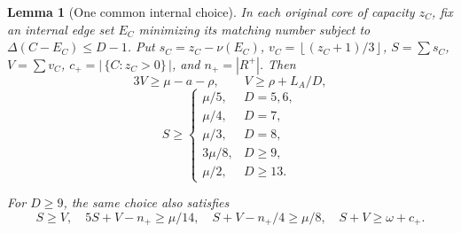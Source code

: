 \documentclass[11pt,a4paper]{article}
\newcommand{\floor}[1]{\left\lfloor#1\right\rfloor}
\newtheorem{lemma}[theorem]{Lemma}
\theoremstyle{definition}
\begin{document}
\begin{lemma}[One common internal choice]\label{lem:internal-saving}
In each original core of capacity $z_C$, fix an internal edge set $E_C$ minimizing its matching number subject to
$\Delta(C-E_C)\le D-1$. Put
$s_C=z_C-\nu(E_C)$, $v_C=\floor{(z_C+1)/3}$,
$S=\sum s_C$, $V=\sum v_C$, $c_+=|\,\{C:z_C>0\}\,|$, and $n_+=|R^+|$.
Then
\[
3V\ge\mu-a-\rho,\qquad V\ge\rho+L_A/D,
\]
\[
 S\ge
 \begin{cases}
 \mu/5,&D=5,6,\\
 \mu/4,&D=7,\\
 \mu/3,&D=8,\\
 3\mu/8,&D\ge9,\\
 \mu/2,&D\ge13.
 \end{cases}
\]

For $D\ge9$, the same choice also satisfies
\begin{equation}\label{eq:internal-strong}
 S\ge V,\quad 5S+V-n_+\ge\mu/14,\quad
 S+V-n_+/4\ge\mu/8,\quad S+V\ge\omega+c_+.
\end{equation}
\end{lemma}
\end{document}
